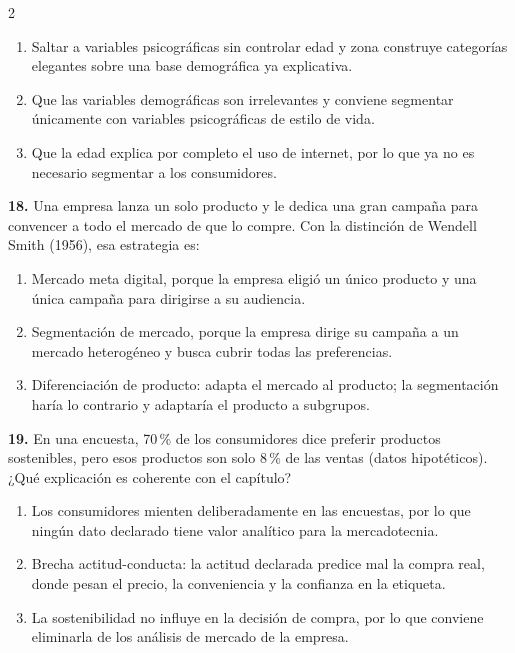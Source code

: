 \documentclass[10pt,letterpaper]{article}
\begin{document}
\begin{multicols}{2}
\begin{enumerate}[label=\alph*),leftmargin=1.1em,itemsep=0pt,topsep=1pt,parsep=0pt,partopsep=0pt]
\item Saltar a variables psicográficas sin controlar edad y zona construye categorías elegantes sobre una base demográfica ya explicativa.
\item Que las variables demográficas son irrelevantes y conviene segmentar únicamente con variables psicográficas de estilo de vida.
\item Que la edad explica por completo el uso de internet, por lo que ya no es necesario segmentar a los consumidores.
\end{enumerate}
\vspace{2pt}
\noindent\textbf{18.} Una empresa lanza un solo producto y le dedica una gran campaña para convencer a todo el mercado de que lo compre. Con la distinción de Wendell Smith (1956), esa estrategia es:
\vspace{-3pt}
\begin{enumerate}[label=\alph*),leftmargin=1.1em,itemsep=0pt,topsep=1pt,parsep=0pt,partopsep=0pt]
\item Mercado meta digital, porque la empresa eligió un único producto y una única campaña para dirigirse a su audiencia.
\item Segmentación de mercado, porque la empresa dirige su campaña a un mercado heterogéneo y busca cubrir todas las preferencias.
\item Diferenciación de producto: adapta el mercado al producto; la segmentación haría lo contrario y adaptaría el producto a subgrupos.
\end{enumerate}
\vspace{2pt}
\noindent\textbf{19.} En una encuesta, 70\,\% de los consumidores dice preferir productos sostenibles, pero esos productos son solo 8\,\% de las ventas (datos hipotéticos). ¿Qué explicación es coherente con el capítulo?
\vspace{-3pt}
\begin{enumerate}[label=\alph*),leftmargin=1.1em,itemsep=0pt,topsep=1pt,parsep=0pt,partopsep=0pt]
\item Los consumidores mienten deliberadamente en las encuestas, por lo que ningún dato declarado tiene valor analítico para la mercadotecnia.
\item Brecha actitud-conducta: la actitud declarada predice mal la compra real, donde pesan el precio, la conveniencia y la confianza en la etiqueta.
\item La sostenibilidad no influye en la decisión de compra, por lo que conviene eliminarla de los análisis de mercado de la empresa.
\end{enumerate}

\end{multicols}
\end{document}
